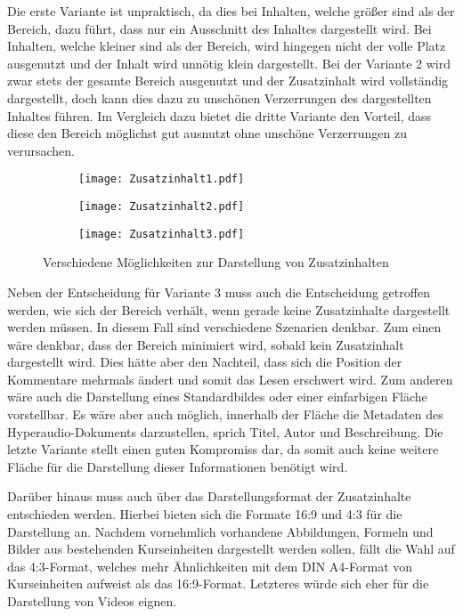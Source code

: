 Die erste Variante ist unpraktisch, da dies bei Inhalten, welche größer sind als der Bereich, dazu führt, dass nur ein Ausschnitt des Inhaltes dargestellt wird. Bei Inhalten, welche kleiner sind als der Bereich, wird hingegen nicht der volle Platz ausgenutzt und der Inhalt wird unnötig klein dargestellt. Bei der Variante 2 wird zwar stets der gesamte Bereich ausgenutzt und der Zusatzinhalt wird vollständig dargestellt, doch kann dies dazu zu unschönen Verzerrungen des dargestellten Inhaltes führen. Im Vergleich dazu bietet die dritte Variante den Vorteil, dass diese den Bereich möglichst gut ausnutzt ohne unschöne Verzerrungen zu verursachen.

\begin{figure}[h!]
\begin{subfigure}[c]{0.32\textwidth}
\texttt{[image: Zusatzinhalt1.pdf]}
\label{fig:Zusatzinhalt1}
\end{subfigure}
\begin{subfigure}[c]{0.32\textwidth}
\texttt{[image: Zusatzinhalt2.pdf]}
\label{fig:Zusatzinhalt2}
\end{subfigure}
\begin{subfigure}[c]{0.32\textwidth}
\texttt{[image: Zusatzinhalt3.pdf]}
\label{fig:Zusatzinhalt3}
\end{subfigure}
\caption{Verschiedene Möglichkeiten zur Darstellung von Zusatzinhalten}
\label{fig:Zusatzinhalt}
\end{figure}

Neben der Entscheidung für Variante 3 muss auch die Entscheidung getroffen werden, wie sich der Bereich verhält, wenn gerade keine Zusatzinhalte dargestellt werden müssen. In diesem Fall sind verschiedene Szenarien denkbar. Zum einen wäre denkbar, dass der Bereich minimiert wird, sobald kein Zusatzinhalt dargestellt wird. Dies hätte aber den Nachteil, dass sich die Position der Kommentare mehrmals ändert und somit das Lesen erschwert wird. Zum anderen wäre auch die Darstellung eines Standardbildes oder einer einfarbigen Fläche vorstellbar. Es wäre aber auch möglich, innerhalb der Fläche die Metadaten des Hyperaudio-Dokuments darzustellen, sprich Titel, Autor und Beschreibung. Die letzte Variante stellt einen guten Kompromiss dar, da somit auch keine weitere Fläche für die Darstellung dieser Informationen benötigt wird.

Darüber hinaus muss auch über das Darstellungsformat der Zusatzinhalte entschieden werden. Hierbei bieten sich die Formate 16:9 und 4:3 für die Darstellung an. Nachdem vornehmlich vorhandene Abbildungen, Formeln und Bilder aus bestehenden Kurseinheiten dargestellt werden sollen, fällt die Wahl auf das 4:3-Format, welches mehr Ähnlichkeiten mit dem DIN A4-Format von Kurseinheiten aufweist als das 16:9-Format. Letzteres würde sich eher für die Darstellung von Videos eignen.


